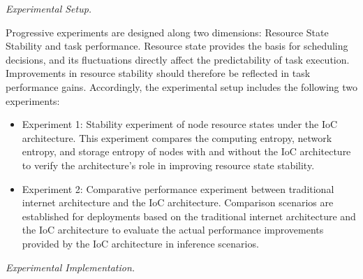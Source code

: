 \documentclass{ccjnl}
\begin{document}
\par
{}
\noindent\textit{Experimental Setup.}\par

Progressive experiments are designed along two dimensions: Resource State Stability and task performance. Resource state provides the basis for scheduling decisions, and its fluctuations directly affect the predictability of task execution. Improvements in resource stability should therefore be reflected in task performance gains. Accordingly, the experimental setup includes the following two experiments:

\begin{itemize}[nosep]
	\item Experiment 1: Stability experiment of node resource states under the IoC architecture. This experiment compares the computing entropy, network entropy, and storage entropy of nodes with and without the IoC architecture to verify the architecture's role in improving resource state stability.
	
	\item Experiment 2: Comparative performance experiment between traditional internet architecture and the IoC architecture. Comparison scenarios are established for deployments based on the traditional internet architecture and the IoC architecture to evaluate the actual performance improvements provided by the IoC architecture in inference scenarios.
\end{itemize}

\par
{}
\noindent\textit{Experimental Implementation.}\par
\end{document}
